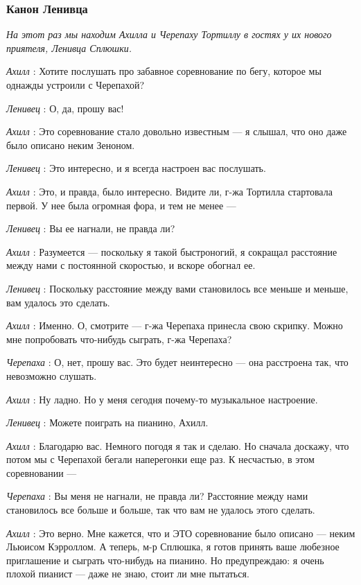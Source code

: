 \subsubsection{Канон Ленивца}

\emph{На этот раз мы находим Ахилла и Черепаху Тортиллу в гостях у их нового приятеля, Ленивца Сплюшки.}

\emph{Ахилл} : Хотите послушать про забавное соревнование по бегу, которое мы однажды устроили с Черепахой?

\emph{Ленивец} : О, да, прошу вас!

\emph{Ахилл} : Это соревнование стало довольно известным --- я слышал, что оно даже было описано неким Зеноном.

\emph{Ленивец} : Это интересно, и я всегда настроен вас послушать.

\emph{Ахилл} : Это, и правда, было интересно. Видите ли, г-жа Тортилла стартовала первой. У нее была огромная фора, и тем не менее ---

\emph{Ленивец} : Вы ее нагнали, не правда ли?

\emph{Ахилл} : Разумеется --- поскольку я такой быстроногий, я сокращал расстояние между нами с постоянной скоростью, и вскоре обогнал ее.

\emph{Ленивец} : Поскольку расстояние между вами становилось все меньше и меньше, вам удалось это сделать.

\emph{Ахилл} : Именно. О, смотрите --- г-жа Черепаха принесла свою скрипку. Можно мне попробовать что-нибудь сыграть, г-жа Черепаха?

\emph{Черепаха} : О, нет, прошу вас. Это будет неинтересно --- она расстроена так, что невозможно слушать.

\emph{Ахилл} : Ну ладно. Но у меня сегодня почему-то музыкальное настроение.

\emph{Ленивец} : Можете поиграть на пианино, Ахилл.

\emph{Ахилл} : Благодарю вас. Немного погодя я так и сделаю. Но сначала доскажу, что потом мы с Черепахой бегали наперегонки еще раз. К несчастью, в этом соревновании ---

\emph{Черепаха} : Вы меня не нагнали, не правда ли? Расстояние между нами становилось все больше и больше, так что вам не удалось этого сделать.

\emph{Ахилл} : Это верно. Мне кажется, что и ЭТО соревнование было описано --- неким Льюисом Кэрроллом. А теперь, м-р Сплюшка, я готов принять ваше любезное приглашение и сыграть что-нибудь на пианино. Но предупреждаю: я очень плохой пианист --- даже не знаю, стоит ли мне пытаться.


